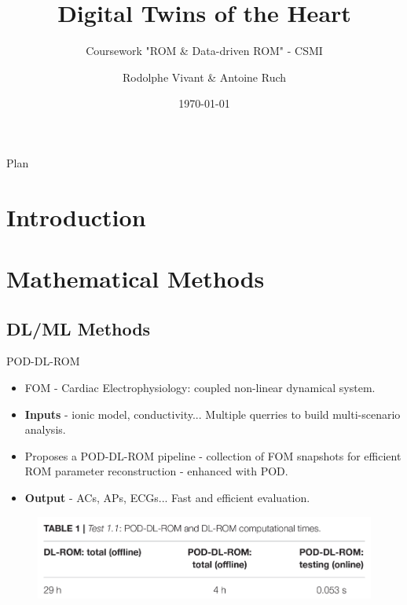 \documentclass{beamer}
\title{Digital Twins of the Heart}
\subtitle{Coursework "ROM \& Data-driven ROM" - CSMI}
\author{Rodolphe Vivant \& Antoine Ruch}
\institute{UFR of Mathematics and Informatics}
\date{\today}
\begin{document}
\begin{frame}
  \titlepage
\end{frame}

\begin{frame}{Plan}
  \tableofcontents
\end{frame}

\section{Introduction}

\section{Mathematical Methods}

\subsection{DL/ML Methods}

\begin{frame}{POD-DL-ROM \cite{Fresca2021}}
  \begin{itemize}
    \item FOM - Cardiac Electrophysiology: coupled non-linear dynamical system.
    \item \textbf{Inputs} - ionic model, conductivity... Multiple querries to build multi-scenario analysis.
    \item Proposes a POD-DL-ROM pipeline - collection of FOM snapshots for efficient ROM parameter reconstruction - enhanced with POD.
    \item \textbf{Output} - ACs, APs, ECGs... Fast and efficient evaluation.
  \end{itemize}

  \begin{figure}
      \centering
      \includegraphics[width=1\linewidth]{images/POD-DL-ROM-perf.png}
      \caption{\textcite{Fresca2021}}
  \end{figure}
  
\end{frame}
\end{document}
